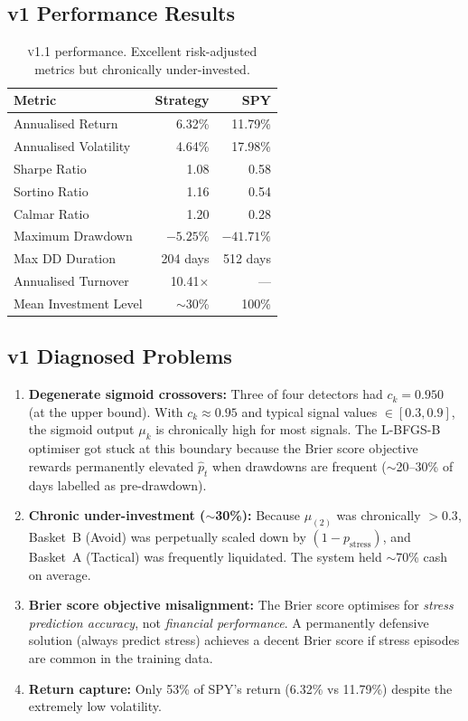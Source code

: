 \documentclass[11pt,a4paper]{article}
\newcommand{\versmark}[1]{\textsc{#1}}
\begin{document}
\subsection{v1 Performance Results}

\begin{table}[h]
\centering
\begin{tabular}{lrr}
\toprule
\textbf{Metric} & \textbf{Strategy} & \textbf{SPY} \\
\midrule
Annualised Return & 6.32\% & 11.79\% \\
Annualised Volatility & 4.64\% & 17.98\% \\
Sharpe Ratio & 1.08 & 0.58 \\
Sortino Ratio & 1.16 & 0.54 \\
Calmar Ratio & 1.20 & 0.28 \\
Maximum Drawdown & $-5.25\%$ & $-41.71\%$ \\
Max DD Duration & 204 days & 512 days \\
Annualised Turnover & 10.41$\times$ & --- \\
Mean Investment Level & $\sim$30\% & 100\% \\
\bottomrule
\end{tabular}
\caption{\versmark{v1.1} performance. Excellent risk-adjusted metrics but chronically under-invested.}
\label{tab:v1-perf}
\end{table}

\subsection{v1 Diagnosed Problems}
\label{sec:v1-problems}

\begin{enumerate}
  \item \textbf{Degenerate sigmoid crossovers:} Three of four detectors had $c_k = 0.950$ (at the upper bound). With $c_k \approx 0.95$ and typical signal values $\in [0.3, 0.9]$, the sigmoid output $\mu_k$ is chronically high for most signals. The L-BFGS-B optimiser got stuck at this boundary because the Brier score objective rewards permanently elevated $\hat{p}_t$ when drawdowns are frequent ($\sim$20--30\% of days labelled as pre-drawdown).

  \item \textbf{Chronic under-investment ($\sim$30\%):} Because $\mu_{(2)}$ was chronically $> 0.3$, Basket~B (Avoid) was perpetually scaled down by $(1 - p_{\mathrm{stress}})$, and Basket~A (Tactical) was frequently liquidated. The system held $\sim$70\% cash on average.

  \item \textbf{Brier score objective misalignment:} The Brier score optimises for \emph{stress prediction accuracy}, not \emph{financial performance}. A permanently defensive solution (always predict stress) achieves a decent Brier score if stress episodes are common in the training data.

  \item \textbf{Return capture:} Only 53\% of SPY's return (6.32\% vs 11.79\%) despite the extremely low volatility.
\end{enumerate}
\end{document}
